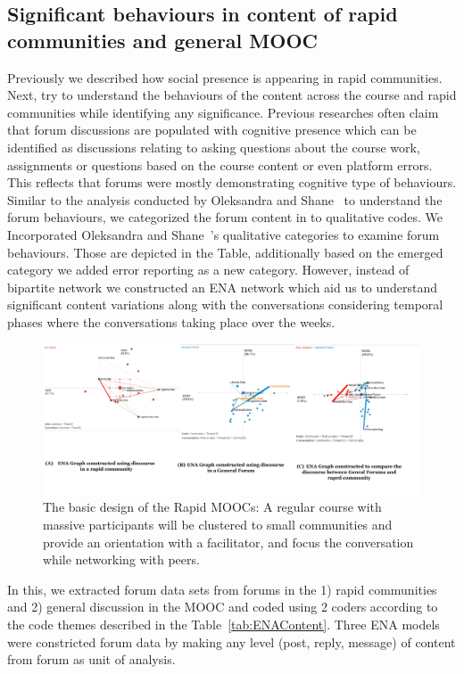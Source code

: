 \documentclass[manuscript,screen,review]{acmart}
\begin{document}
\subsection{Significant behaviours in content of rapid communities and general MOOC}

Previously we described how social presence is appearing in rapid communities. Next, try to understand the behaviours of the content across the course and rapid communities while identifying any significance. Previous researches often claim that forum discussions are populated with cognitive presence which can be identified as discussions relating to asking questions about the course work, assignments or questions based on the course content or even platform errors. This reflects that forums were mostly demonstrating cognitive type of behaviours. Similar to the analysis conducted by Oleksandra and Shane~\cite{oleksandra2016untangling} to understand the forum behaviours, we categorized the forum content in to qualitative codes. We Incorporated  Oleksandra and Shane~\cite{oleksandra2016untangling}'s qualitative categories to examine forum behaviours. Those are depicted in the Table, additionally based on the emerged category we added error reporting as a new category. However, instead of bipartite network we constructed an ENA network which aid us to understand significant content variations along with the conversations considering temporal phases where the conversations taking place over the weeks. 

\begin{figure}[h]
  \centering
  \includegraphics[width=\linewidth]{images/ENA Diagrams.png}
  \caption{The basic design of the Rapid MOOCs: A regular course with massive participants will be clustered to small communities and provide an orientation with a facilitator, and focus the conversation while networking with peers.}
 \label{fig:ENADiagrams}
\end{figure}

In this, we extracted forum data sets from forums in the 1) rapid communities and 2) general discussion in the MOOC and coded using 2 coders according to the code themes described in the Table~\ref{tab:ENAContent}. Three ENA models were constricted forum data by making any level (post, reply, message) of content from forum as unit of analysis.
\end{document}

